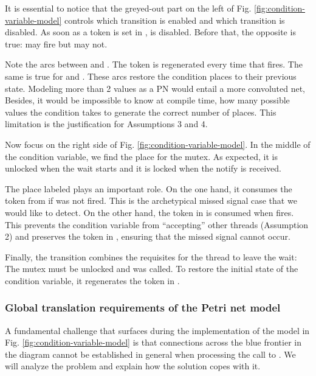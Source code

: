 It is essential to notice that the greyed-out part
on the left of Fig. \ref{fig:condition-variable-model}
controls which transition is enabled and which transition is disabled.
As soon as a token is set in ,  is disabled.
Before that, the opposite is true:  may fire but  may not.

Note the arcs between  and .
The token is regenerated every time that  fires.
The same is true for  and .
These arcs restore the condition places to their previous state.
Modeling more than 2 values as a \acrshort{PN} would entail a more convoluted net,
Besides, it would be impossible to know at compile time,
how many possible values the condition takes to generate the correct number of places.
This limitation is the justification for Assumptions 3 and 4.

Now focus on the right side of Fig. \ref{fig:condition-variable-model}.
In the middle of the condition variable, we find the place for the mutex.
As expected, it is unlocked when the wait starts
and it is locked when the notify is received.

The place labeled  plays an important role.
On the one hand, it consumes the token from 
if  was not fired.
This is the archetypical missed signal case that we would like to detect.
On the other hand, the token in 
is consumed when  fires.
This prevents the condition variable from ``accepting'' other threads (Assumption 2)
and preserves the token in , ensuring that the missed signal cannot occur.

Finally, the  transition combines the requisites
for the thread to leave the wait: The mutex must be unlocked and  was called.
To restore the initial state of the condition variable,
it regenerates the token in .

\subsubsection{Global translation requirements of the Petri net model}

A fundamental challenge that surfaces
during the implementation of the model in Fig. \ref{fig:condition-variable-model}
is that connections across the blue frontier in the diagram cannot be established
in general when processing the call to .
We will analyze the problem and explain how the solution copes with it.

